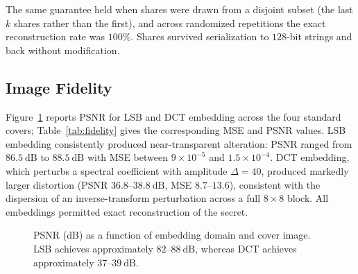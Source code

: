 \documentclass[runningheads]{llncs}
\begin{document}
The same guarantee held when shares were drawn from a disjoint subset (the last
$k$ shares rather than the first), and across randomized repetitions the exact
reconstruction rate was $100\%$. Shares survived serialization to $128$-bit
strings and back without modification.

\subsection{Image Fidelity}

Figure~\ref{fig:psnr} reports PSNR for LSB and DCT embedding across the four
standard covers; Table~\ref{tab:fidelity} gives the corresponding MSE and PSNR
values. LSB embedding consistently produced near-transparent alteration: PSNR
ranged from $86.5~\mathrm{dB}$ to $88.5~\mathrm{dB}$ with MSE between
$9\times10^{-5}$ and $1.5\times10^{-4}$. DCT embedding, which perturbs a
spectral coefficient with amplitude $\Delta = 40$, produced markedly larger
distortion (PSNR $36.8$--$38.8~\mathrm{dB}$, MSE $8.7$--$13.6$), consistent
with the dispersion of an inverse-transform perturbation across a full
$8\times8$ block. All embeddings permitted exact reconstruction of the secret.

\begin{figure}[t]
\centering
{}
\caption{PSNR (dB) as a function of embedding domain and cover image. LSB
achieves approximately $82$--$88~\mathrm{dB}$, whereas DCT achieves
approximately $37$--$39~\mathrm{dB}$.}
\label{fig:psnr}
\end{figure}
\end{document}
